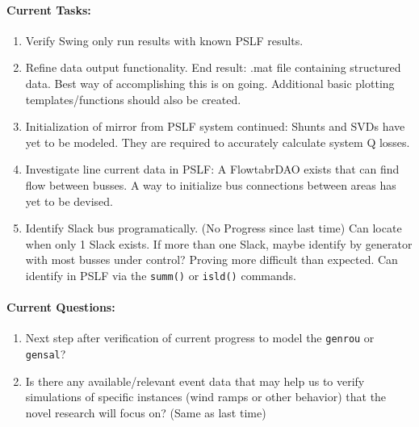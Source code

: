 \documentclass[12pt]{article}
\begin{document}
	\paragraph{Current Tasks:}
	\begin{enumerate}
		\item Verify Swing only run results with known PSLF results.
		
		\item Refine data output functionality.
		\subitem End result: .mat file containing structured data. Best way of accomplishing this is on going.
		\subitem Additional basic plotting templates/functions should also be created.
		
		\item Initialization of mirror from PSLF system continued:
		\subitem Shunts and SVDs have yet to be modeled. They are required to accurately calculate system Q losses. 
		
		\item Investigate line current data in PSLF:
		\subitem A FlowtabrDAO exists that can find flow between busses. A way to initialize bus connections between areas has yet to be devised.
		
		\item Identify Slack bus programatically. (No Progress since last time)
		\subitem Can locate when only 1 Slack exists. If more than one Slack, maybe identify by generator with most busses under control? Proving more difficult than expected. Can identify in PSLF via the \verb|summ()| or \verb|isld()| commands. 
		
	\end{enumerate}
	\paragraph{Current Questions:}
	\begin{enumerate}
		
		
		\item Next step after verification of current progress to model the \verb|genrou| or \verb|gensal|?
		
		\item Is there any available/relevant event data that may help us to verify simulations of specific instances (wind ramps or other behavior) that the novel research will focus on? (Same as last time)
	\end{enumerate}
	\begin{comment}
	\paragraph{Random Thoughts:}
	\begin{enumerate}
	\item Numerical integration at beginning of simulation may require extra care as to avoid out of index errors. -Maybe not because python can do limited negative indexing.
	\end{enumerate}
	\end{comment}
\pagebreak
\end{document}
